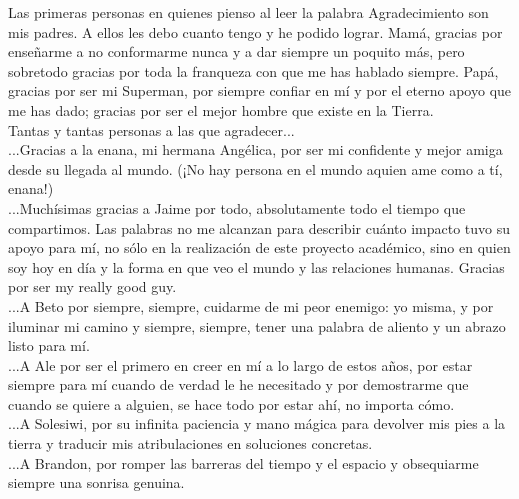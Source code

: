 \documentclass[
11pt, %
spanish, %
singlespacing, %
headsepline, %
]{MastersDoctoralThesis} %
\begin{document}

\begin{acknowledgements}
\addchaptertocentry{\acknowledgementname} %

Las primeras personas en quienes pienso al leer la palabra Agradecimiento son mis padres. A ellos les debo cuanto tengo y he podido lograr. Mamá, gracias por enseñarme a no conformarme nunca y a dar siempre un poquito más, pero sobretodo gracias por toda la franqueza con que me has hablado siempre. Papá, gracias por ser mi Superman, por siempre confiar en mí y por el eterno apoyo que me has dado; gracias por ser el mejor hombre que existe en la Tierra.\\

Tantas y tantas personas a las que agradecer...\\

...Gracias a la enana, mi hermana Angélica, por ser mi confidente y mejor amiga desde su llegada al mundo. (¡No hay persona en el mundo aquien ame como a tí, enana!) \\

...Muchísimas gracias a Jaime por todo, absolutamente todo el tiempo que compartimos. Las palabras no me alcanzan para describir cuánto impacto tuvo su apoyo para mí, no sólo en la realización de este proyecto académico, sino en quien soy hoy en día y la forma en que veo el mundo y las relaciones humanas. Gracias por ser my really good guy.\\

...A Beto por siempre, siempre, cuidarme de mi peor enemigo: yo misma, y por iluminar mi camino y siempre, siempre, tener una palabra de aliento y un abrazo listo para mí. \\

...A Ale por ser el primero en creer en mí a lo largo de estos años, por estar siempre para mí cuando de verdad le he necesitado y por demostrarme que cuando se quiere a alguien, se hace todo por estar ahí, no importa cómo.\\

...A Solesiwi, por su infinita paciencia y mano mágica para devolver mis pies a la tierra y traducir mis atribulaciones en soluciones concretas.\\

...A Brandon, por romper las barreras del tiempo y el espacio y obsequiarme siempre una sonrisa genuina.\\


\end{acknowledgements}
\end{document}
